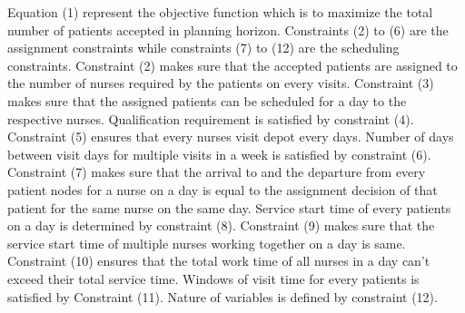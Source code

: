 \documentclass[12pt, letterpaper]{article}
\begin{document}
Equation (1) represent the objective function which is to maximize the total number of patients accepted in planning horizon. Constraints (2) to (6) are the assignment constraints while constraints (7) to (12) are the scheduling constraints. Constraint (2) makes sure that the accepted patients are assigned to the number of nurses required by the patients on every visits. Constraint (3) makes sure that the assigned patients can be scheduled for a day to the respective nurses. Qualification requirement is satisfied by constraint (4). Constraint (5) ensures that every nurses visit depot every days. Number of days between visit days for multiple visits in a week is satisfied by constraint (6). Constraint (7) makes sure that the arrival to and the departure from every patient nodes for a nurse on a day is equal to the assignment decision of that patient for the same nurse on the same day. Service start time of every patients on a day is determined by constraint (8). Constraint (9) makes sure that the service start time of multiple nurses working together on a day is same. Constraint (10) ensures that the total work time of all nurses in a day can't exceed their total service time. Windows of visit time for every patients is satisfied by Constraint (11). Nature of variables is defined by constraint (12).
\end{document}

